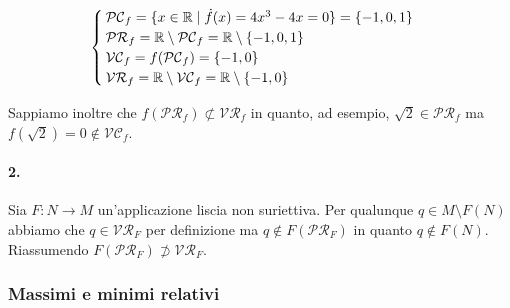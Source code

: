 \begin{equation}
	\begin{cases}
		\mathcal{PC}_{f} = \{ x \in \mathbb{R} \mid \dot{f}(x) = 4 x^{3} - 4 x = 0 \} = \{ -1, 0, 1 \}\\
		\mathcal{PR}_{f} = \mathbb{R} \setminus \mathcal{PC}_{f} = \mathbb{R} \setminus \{ -1, 0, 1 \}\\
		\mathcal{VC}_{f} = f(\mathcal{PC}_{f}) = \{ -1, 0 \}\\
		\mathcal{VR}_{f} = \mathbb{R} \setminus \mathcal{VC}_{f} = \mathbb{R} \setminus \{ -1, 0 \}
	\end{cases}
\end{equation}

Sappiamo inoltre che $ f(\mathcal{PR}_{f}) \not\subset \mathcal{VR}_{f} $ in quanto, ad esempio, $ \sqrt{2} \in \mathcal{PR}_{f} $ ma $ f(\sqrt{2}) = 0 \notin \mathcal{VC}_{f} $.

\paragraph{2.}

Sia $ F : N \to M $ un'applicazione liscia non suriettiva. Per qualunque $ q \in M \setminus F(N) $ abbiamo che $ q \in \mathcal{VR}_{F} $ per definizione ma $ q \notin F(\mathcal{PR}_{F}) $ in quanto $ q \notin F(N) $.\\
Riassumendo $ F(\mathcal{PR}_{F}) \not\supset \mathcal{VR}_{F} $.

\subsubsection{Massimi e minimi relativi}

